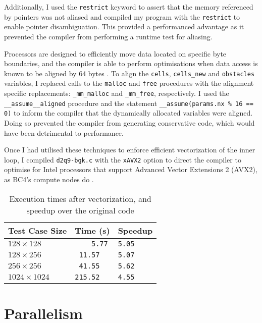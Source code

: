 \documentclass[11pt, twocolumn, a4paper]{article}
\begin{document}
Additionally, I used the \texttt{restrict} keyword to assert that the memory referenced by pointers was not aliased and compiled my program with the \texttt{restrict} to enable pointer disambiguation.
This provided a performanced advantage as it prevented the compiler from performing a runtime test for aliasing.

Processors are designed to efficiently move data located on specific byte boundaries, and the compiler is able to perform optimisations when data access is known to be aligned by 64 bytes \cite{alignment}.
To align the \texttt{cells}, \texttt{cells\_new} and \texttt{obstacles} variables, I replaced calls to the \texttt{malloc} and \texttt{free} procedures with the alignment specific replacements: \texttt{\_mm\_malloc} and \texttt{\_mm\_free}, respectively.
I used the \texttt{\_\_assume\_\_aligned} procedure and  the statement \texttt{\_\_assume(params.nx \% 16 == 0)} to inform the compiler that the dynamically allocated variables were aligned.
Doing so prevented the compiler from generating conservative code, which would have been detrimental to performance.

Once I had utilised these techniques to enforce efficient vectorization of the inner loop, I compiled \texttt{d2q9-bgk.c} with the \texttt{xAVX2} option to direct the compiler to optimise for Intel processors that support Advanced Vector Extensions 2 (AVX2), as BC4's compute nodes do \cite{lenovo}.

\begin{table}[htbp]
  \begin{center}
  \caption{Execution times after vectorization, and speedup over the original code}\label{tab:vectorized}
  \begin{tabular}{l | l l} 
      \hline\hline
      Test Case Size&Time (s)&Speedup\\
      \hline
      $128 \times 128$&\texttt{  \,\,\,5.77}&\texttt{5.05}\\
      $128 \times 256$&\texttt{ 11.57}&\texttt{5.07}\\
      $256 \times 256$&\texttt{ 41.55}&\texttt{5.62}\\
      $1024 \times 1024$&\texttt{215.52}&\texttt{4.55}\\
      \hline
    \end{tabular}
  \end{center}
\end{table}

\section{Parallelism}
\end{document}
